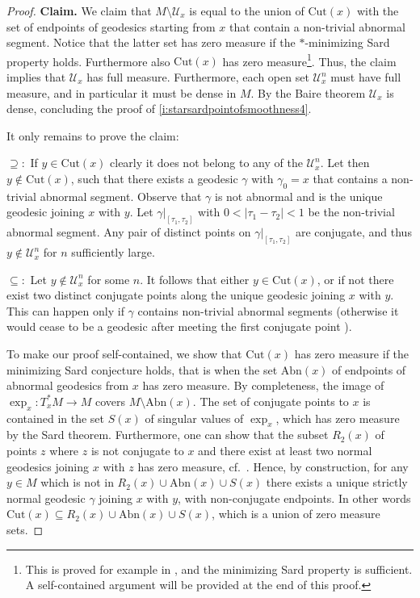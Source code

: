 \documentclass[11pt,a4paper]{article}
\theoremstyle{plain}
\theoremstyle{definition}
\theoremstyle{remark}
\numberwithin{equation}{section}
\newcommand{\Cut}{\mathrm{Cut}}
\begin{document}
\begin{proof}
\textbf{Claim.} We claim that $M\setminus \mathcal{U}_x$ is equal to the union of $\Cut(x)$ with the set of endpoints of geodesics starting from $x$ that contain a non-trivial abnormal segment. Notice that the latter set has zero measure if the $*$-minimizing Sard property holds. Furthermore also $\mathrm{Cut}(x)$ has zero measure\footnote{This is proved for example in \cite[Prop.\@ 6]{BR-realanalMCP}, and the minimizing Sard property is sufficient. A self-contained argument will be provided at the end of this proof.}. Thus, the claim implies that $\mathcal{U}_x$ has full measure. Furthermore, each open set $\mathcal{U}_x^n$ must have full measure, and in particular it must be dense in $M$. By the Baire theorem $\mathcal{U}_x$ is dense, concluding the proof of \ref{i:starsardpointofsmoothness4}. 

It only remains to prove the claim:

$\supseteq:$ If $y\in \Cut(x)$ clearly it does not belong to any of the $\mathcal{U}_x^n$. Let then $y\notin\Cut(x)$, such that there exists a geodesic $\gamma$ with $\gamma_0 = x$ that contains a non-trivial abnormal segment. Observe that $\gamma$ is not abnormal and is the unique geodesic joining $x$ with $y$. Let $\gamma|_{[\tau_1,\tau_2]}$ with $0<|\tau_1-\tau_2|<1$ be the non-trivial abnormal segment. Any pair of distinct points on $\gamma|_{[\tau_1,\tau_2]}$ are conjugate, and thus $y\notin \mathcal{U}_x^n$ for $n$ sufficiently large.

$\subseteq:$ Let $y\notin \mathcal{U}_x^n$ for some $n$. It follows that either $y \in \Cut(x)$, or if not there exist two distinct conjugate points along the unique geodesic joining $x$ with $y$. This can happen only if $\gamma$ contains non-trivial abnormal segments (otherwise it would cease to be a geodesic after meeting the first conjugate point \cite[Thm.\@ 72]{BRInv}).


To make our proof self-contained, we show that $\mathrm{Cut}(x)$ has zero measure if the minimizing Sard conjecture holds, that is when the set $\mathrm{Abn}(x)$ of endpoints of abnormal geodesics from $x$ has zero measure. By completeness, the image of $\exp_x : T_x^*M \to M$ covers $M\setminus \mathrm{Abn}(x)$. The set of conjugate points to $x$ is contained in the set $S(x)$ of singular values of $\exp_x$, which has zero measure by the Sard theorem. Furthermore, one can show that the subset $R_2(x)$ of points $z$ where $z$ is not conjugate to $x$ and there exist at least two normal geodesics joining $x$ with $z$ has zero measure, cf.\ \cite[Lemma 4.8]{RT-MorseSard}. Hence, by construction, for any $y\in M$ which is not in $R_2(x) \cup \mathrm{Abn}(x) \cup S(x)$ there exists a unique strictly normal geodesic $\gamma$ joining $x$ with $y$, with non-conjugate endpoints. In other words $\mathrm{Cut}(x) \subseteq R_2(x) \cup \mathrm{Abn}(x) \cup S(x)$, which is a union of zero measure sets.
\end{proof}
\end{document}
